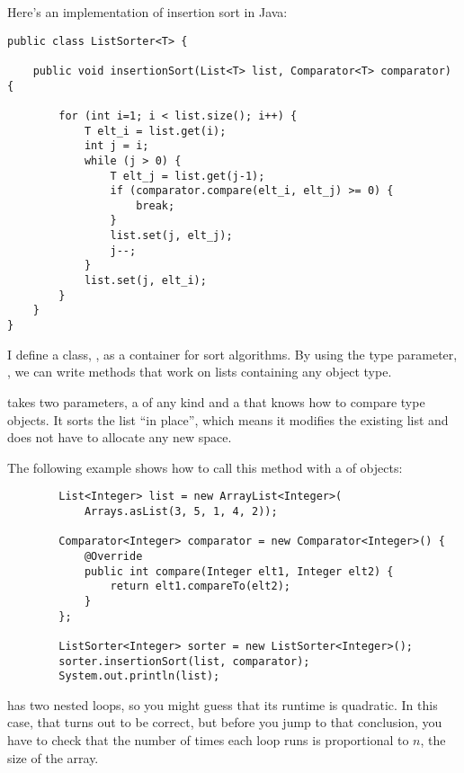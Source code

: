 \documentclass[12pt]{book}
\theoremstyle{exercise}
\begin{document}
Here's an implementation of insertion sort in Java:

\begin{verbatim}
public class ListSorter<T> {

    public void insertionSort(List<T> list, Comparator<T> comparator) {

        for (int i=1; i < list.size(); i++) {
            T elt_i = list.get(i);
            int j = i;
            while (j > 0) {
                T elt_j = list.get(j-1);
                if (comparator.compare(elt_i, elt_j) >= 0) {
                    break;
                }
                list.set(j, elt_j);
                j--;
            }
            list.set(j, elt_i);
        }
    }
}
\end{verbatim}

I define a class, , as a container for sort
algorithms. By using the type parameter, , we can write
methods that work on lists containing any object type.


 takes two parameters, a  of any kind
and a  that knows how to compare type 
objects. It sorts the list ``in place'', which means it modifies the
existing list and does not have to allocate any new space.


The following example shows how to call this method with a  of
 objects:

\begin{verbatim}
        List<Integer> list = new ArrayList<Integer>(
            Arrays.asList(3, 5, 1, 4, 2));

        Comparator<Integer> comparator = new Comparator<Integer>() {
            @Override
            public int compare(Integer elt1, Integer elt2) {
                return elt1.compareTo(elt2);
            }
        };

        ListSorter<Integer> sorter = new ListSorter<Integer>();
        sorter.insertionSort(list, comparator);
        System.out.println(list);
\end{verbatim}

 has two nested loops, so you might guess that
its runtime is quadratic. In this case, that turns out to be correct,
but before you jump to that conclusion, you have to check that the
number of times each loop runs is proportional to $n$, the size
of the array.
\end{document}

